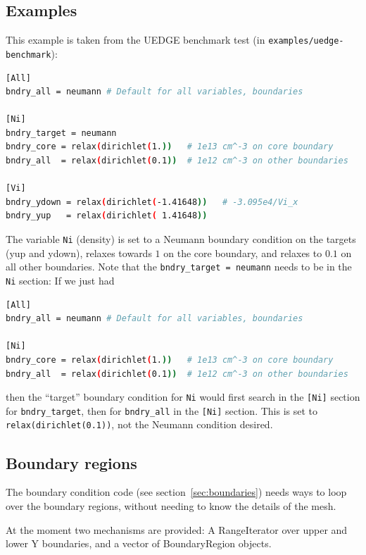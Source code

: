 \documentclass[12pt]{article}
\newcommand{\code}[1]{\texttt{#1}}
\begin{document}
\subsection{Examples}
%
This example is taken from the UEDGE benchmark test (in
\texttt{examples/uedge-benchmark}):
%
\begin{lstlisting}[language=bash,numbers=none]
[All]
bndry_all = neumann # Default for all variables, boundaries

[Ni]
bndry_target = neumann
bndry_core = relax(dirichlet(1.))   # 1e13 cm^-3 on core boundary
bndry_all  = relax(dirichlet(0.1))  # 1e12 cm^-3 on other boundaries

[Vi]
bndry_ydown = relax(dirichlet(-1.41648))   # -3.095e4/Vi_x
bndry_yup   = relax(dirichlet( 1.41648))
\end{lstlisting}
%
The variable \code{Ni} (density) is set to a Neumann boundary condition on the
targets (yup and ydown), relaxes towards $1$ on the core boundary, and relaxes
to $0.1$ on all other boundaries. Note that the \code{bndry\_target = neumann}
needs to be in the \code{Ni} section: If we just had
%
\begin{lstlisting}[language=bash,numbers=none]
[All]
bndry_all = neumann # Default for all variables, boundaries

[Ni]
bndry_core = relax(dirichlet(1.))   # 1e13 cm^-3 on core boundary
bndry_all  = relax(dirichlet(0.1))  # 1e12 cm^-3 on other boundaries
\end{lstlisting}
%
then the ``target'' boundary condition for \code{Ni} would first search in the
\code{[Ni]} section for \code{bndry\_target}, then for \code{bndry\_all} in the
\code{[Ni]} section. This is set to \code{relax(dirichlet(0.1))}, not the
Neumann condition desired.



\subsection{Boundary regions}
%
The boundary condition code (see section~\ref{sec:boundaries}) needs ways to
loop over the boundary regions, without needing to know the details of the
mesh.

At the moment two mechanisms are provided: A RangeIterator over upper and lower
Y boundaries, and a vector of BoundaryRegion
%
%
 objects.
\end{document}
